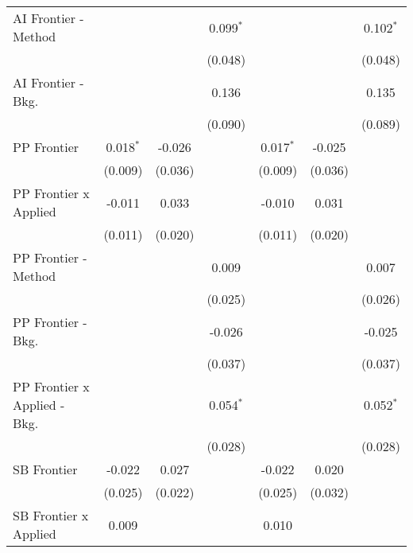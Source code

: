 \begin{tabular}{lcccccc}
   AI Frontier - Method         &              &         & 0.099$^{*}$  &              &             & 0.102$^{*}$\\   
                                &              &         & (0.048)      &              &             & (0.048)\\   
   AI Frontier - Bkg.           &              &         & 0.136        &              &             & 0.135\\   
                                &              &         & (0.090)      &              &             & (0.089)\\   
   PP Frontier                  & 0.018$^{*}$  & -0.026  &              & 0.017$^{*}$  & -0.025      &   \\   
                                & (0.009)      & (0.036) &              & (0.009)      & (0.036)     &   \\   
   PP Frontier x Applied        & -0.011       & 0.033   &              & -0.010       & 0.031       &   \\   
                                & (0.011)      & (0.020) &              & (0.011)      & (0.020)     &   \\   
   PP Frontier - Method         &              &         & 0.009        &              &             & 0.007\\   
                                &              &         & (0.025)      &              &             & (0.026)\\   
   PP Frontier - Bkg.           &              &         & -0.026       &              &             & -0.025\\   
                                &              &         & (0.037)      &              &             & (0.037)\\   
   PP Frontier x Applied - Bkg. &              &         & 0.054$^{*}$  &              &             & 0.052$^{*}$\\   
                                &              &         & (0.028)      &              &             & (0.028)\\   
   SB Frontier                  & -0.022       & 0.027   &              & -0.022       & 0.020       &   \\   
                                & (0.025)      & (0.022) &              & (0.025)      & (0.032)     &   \\   
   SB Frontier x Applied        & 0.009        &         &              & 0.010        &             &   \\   

\end{tabular}
